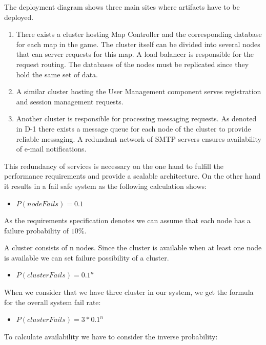\documentclass[11pt]{article}
\begin{document}
The deployment diagram shows three main sites where artifacts have to be deployed.
\begin{enumerate}
\item There exists a cluster hosting Map Controller and the corresponding database for each map in the game. The cluster itself can be divided into several nodes that can server requests for this map. A load balancer is responsible for the request routing. The databases of the nodes must be replicated since they hold the same set of data.
\item A similar cluster hosting the User Management component serves registration and session management requests.
\item Another cluster is responsible for processing messaging requests. As denoted in D-1 there exists a message queue for each node of the cluster to provide reliable messaging. A redundant network of SMTP servers ensures availability of e-mail notifications.
\end{enumerate}

This redundancy of services is necessary on the one hand to fulfill the performance requirements and provide a scalable architecture. On the other hand it results in a fail safe system as the following calculation shows:

\begin{itemize}
\item $P(nodeFails) = 0.1$
\end{itemize}

As the requirements specification denotes we can assume that each node has a failure probability of $10\%$.

A cluster consists of n nodes. Since the cluster is available when at least one node is available we can set failure possibility of a cluster.

\begin{itemize}
\item $P(clusterFails) = 0.1^n$
\end{itemize}

When we consider that we have three cluster in our system, we get the formula for the overall system fail rate:

\begin{itemize}
\item $P(clusterFails) = 3 *0.1^n$
\end{itemize}

To calculate availability we have to consider the inverse probability:
\end{document}
